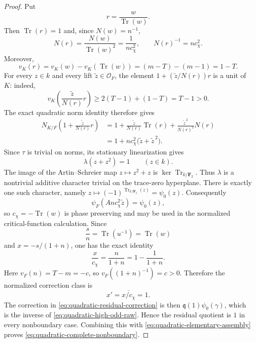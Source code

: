 \documentclass[11pt]{amsart}
\theoremstyle{definition}
\theoremstyle{remark}
\newcommand{\F}{\mathbf F}
\newcommand{\cO}{\mathcal O}
\newcommand{\Tr}{\operatorname{Tr}}
\begin{document}
\begin{proof}
Put
\[
 r=\frac{w}{\Tr(w)}.
\]
Then $\Tr(r)=1$ and, since $N(w)=n^{-1}$,
\[
 N(r)=\frac{N(w)}{\Tr(w)^2}
     =\frac1{n c_\chi^2},
 \qquad
 N(r)^{-1}=n c_\chi^2.
\]
Moreover,
\[
 v_K(r)=v_K(w)-v_K(\Tr(w))
       =(m-T)-(m-1)=1-T.
\]
For every $z\in k$ and every lift $\widetilde z\in\cO_F$, the element
$1+(\widetilde z/N(r))r$ is a unit of $K$: indeed,
\[
 v_K\!\left(\frac{\widetilde z}{N(r)}r\right)
 \ge 2(T-1)+(1-T)=T-1>0.
\]
The exact quadratic norm identity therefore gives
\[
 \begin{aligned}
 N_{K/F}\!\left(1+\frac{\widetilde z}{N(r)}r\right)
 &=1+\frac{\widetilde z}{N(r)}\Tr(r)
      +\frac{\widetilde z^{\,2}}{N(r)^2}N(r)\\
 &=1+n c_\chi^2\bigl(\widetilde z+\widetilde z^{\,2}\bigr).
 \end{aligned}
\]
Since $\tau$ is trivial on norms, its stationary linearization gives
\[
 \lambda(z+z^2)=1 \qquad(z\in k).
\]
The image of the Artin--Schreier map $z\mapsto z^2+z$ is
$\ker\Tr_{k/\F_2}$.  Thus $\lambda$ is a nontrivial additive character
trivial on the trace-zero hyperplane.  There is exactly one such
character, namely
$z\mapsto(-1)^{\Tr_{k/\F_2}(z)}=\psi_0(z)$.  Consequently
\begin{equation}\label{eq:quadratic-chi-polar-normalization-nonboundary}
 \psi_F(An c_\chi^2\widetilde z)=\psi_0(z),
\end{equation}
so $c_\chi=-\Tr(w)$ is phase preserving and may be used in the
normalized critical-function calculation.  Since
\[
 \frac{s}{n}=\Tr(u^{-1})=\Tr(w)
\]
and $x=-s/(1+n)$, one has the exact identity
\[
 \frac{x}{c_\chi}=\frac{n}{1+n}
 =1-\frac1{1+n}.
\]
Here $v_F(n)=T-m=-c$, so $v_F((1+n)^{-1})=c>0$.  Therefore the
normalized correction class is
\begin{equation}\label{eq:quadratic-correction-residue-nonboundary}
 x'=\overline{x/c_\chi}=1.
\end{equation}
The correction in \eqref{eq:quadratic-residual-correction} is then
$\mathfrak q(1)\psi_0(\gamma)$, which is the inverse of
\eqref{eq:quadratic-high-odd-raw}.  Hence the residual quotient is $1$
in every nonboundary case.  Combining this with
\eqref{eq:quadratic-elementary-assembly} proves
\eqref{eq:quadratic-complete-nonboundary}.


\end{proof}
\end{document}
